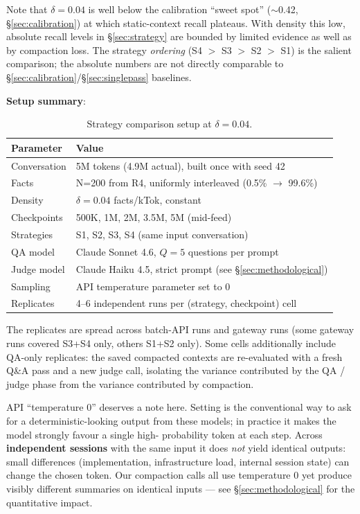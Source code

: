 Note that $\delta=0.04$ is well below the calibration ``sweet spot''
($\sim$0.42, \S\ref{sec:calibration}) at
which static-context recall plateaus. With density this low, absolute recall
levels in \S\ref{sec:strategy} are bounded by limited evidence as well as by compaction loss.
The strategy \textit{ordering} (S4 $>$ S3 $>$ S2 $>$ S1) is the salient comparison; the
absolute numbers are not directly comparable to \S\ref{sec:calibration}/\S\ref{sec:singlepass} baselines.

\textbf{Setup summary}:

\begin{table}[h]
\centering
\caption{Strategy comparison setup at $\delta=0.04$.}
\label{tab:strategy-setup}
\begin{tabular}{ll}
\toprule
Parameter & Value \\
\midrule
Conversation & 5M tokens (4.9M actual), built once with seed 42 \\
Facts        & N=200 from R4, uniformly interleaved (0.5\% $\to$ 99.6\%) \\
Density      & $\delta = 0.04$ facts/kTok, constant \\
Checkpoints  & 500K, 1M, 2M, 3.5M, 5M (mid-feed) \\
Strategies   & S1, S2, S3, S4 (same input conversation) \\
QA model     & Claude Sonnet 4.6, $Q=5$ questions per prompt \\
Judge model  & Claude Haiku 4.5, strict prompt (see \S\ref{sec:methodological}) \\
Sampling     & API temperature parameter set to 0 \\
Replicates   & 4--6 independent runs per (strategy, checkpoint) cell \\
\bottomrule
\end{tabular}
\end{table}

The replicates are spread across batch-API runs and gateway runs (some
gateway runs covered S3+S4 only, others S1+S2 only). Some cells additionally
include QA-only replicates: the saved compacted contexts are re-evaluated
with a fresh Q\&A pass and a new judge call, isolating the variance
contributed by the QA / judge phase from the variance contributed by
compaction.

API ``temperature 0'' deserves a note here. Setting  is the
conventional way to ask for a deterministic-looking output from these
models; in practice it makes the model strongly favour a single high-
probability token at each step. Across \textbf{independent sessions} with the
same input it does \textit{not} yield identical outputs: small differences
(implementation, infrastructure load, internal session state) can change
the chosen token. Our compaction calls all use temperature 0 yet produce
visibly different summaries on identical inputs --- see \S\ref{sec:methodological} for the
quantitative impact.

